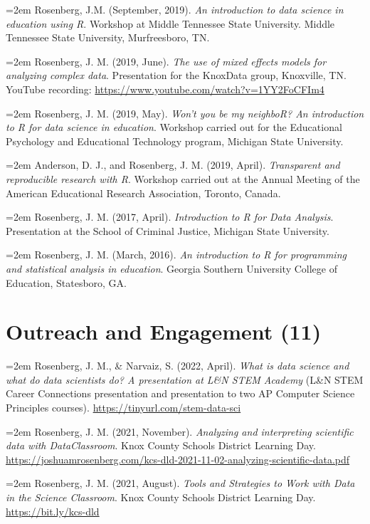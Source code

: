 \documentclass[
  14,
]{article}
\begin{document}
\hangindent=2em Rosenberg, J.M. (September, 2019). \emph{An introduction
to data science in education using R}. Workshop at Middle Tennessee
State University. Middle Tennessee State University, Murfreesboro, TN.

\hangindent=2em Rosenberg, J. M. (2019, June). \emph{The use of mixed
effects models for analyzing complex data}. Presentation for the
KnoxData group, Knoxville, TN. YouTube recording:
\url{https://www.youtube.com/watch?v=1YY2FoCFIm4}

\hangindent=2em Rosenberg, J. M. (2019, May). \emph{Won't you be my
neighboR? An introduction to R for data science in education}. Workshop
carried out for the Educational Psychology and Educational Technology
program, Michigan State University.

\hangindent=2em Anderson, D. J., and Rosenberg, J. M. (2019, April).
\emph{Transparent and reproducible research with R}. Workshop carried
out at the Annual Meeting of the American Educational Research
Association, Toronto, Canada.

\hangindent=2em Rosenberg, J. M. (2017, April). \emph{Introduction to R
for Data Analysis}. Presentation at the School of Criminal Justice,
Michigan State University.

\hangindent=2em Rosenberg, J. M. (March, 2016). \emph{An introduction to
R for programming and statistical analysis in education}. Georgia
Southern University College of Education, Statesboro, GA.

\hypertarget{outreach-and-engagement-11}{%
\section{Outreach and Engagement
(11)}\label{outreach-and-engagement-11}}

\hangindent=2em Rosenberg, J. M., \& Narvaiz, S. (2022, April).
\emph{What is data science and what do data scientists do? A
presentation at L\&N STEM Academy} (L\&N STEM Career Connections
presentation and presentation to two AP Computer Science Principles
courses). \url{https://tinyurl.com/stem-data-sci}

\hangindent=2em Rosenberg, J. M. (2021, November). \emph{Analyzing and
interpreting scientific data with DataClassroom}. Knox County Schools
District Learning Day.
\url{https://joshuamrosenberg.com/kcs-dld-2021-11-02-analyzing-scientific-data.pdf}

\hangindent=2em Rosenberg, J. M. (2021, August). \emph{Tools and
Strategies to Work with Data in the Science Classroom}. Knox County
Schools District Learning Day. \url{https://bit.ly/kcs-dld}
\end{document}
